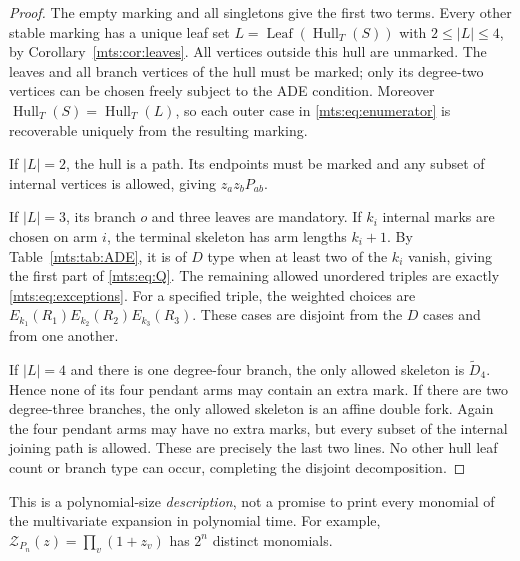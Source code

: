 \documentclass[11pt]{article}
\numberwithin{equation}{section}
\theoremstyle{definition}
\newcommand{\Hull}{\operatorname{Hull}}
\newcommand{\Leaf}{\operatorname{Leaf}}
\newcommand{\Zpoly}{\mathcal Z}
\begin{document}
\begin{proof}
The empty marking and all singletons give the first two terms. Every
other stable marking has a unique leaf set
$L=\Leaf(\Hull_T(S))$ with $2\le|L|\le4$, by Corollary~\ref{mts:cor:leaves}.
All vertices outside this hull are unmarked. The leaves and all branch
vertices of the hull must be marked; only its degree-two vertices can be
chosen freely subject to the ADE condition. Moreover
$\Hull_T(S)=\Hull_T(L)$, so each outer case in \eqref{mts:eq:enumerator} is
recoverable uniquely from the resulting marking.

If $|L|=2$, the hull is a path. Its endpoints must be marked and any
subset of internal vertices is allowed, giving $z_a z_b P_{ab}$.

If $|L|=3$, its branch $o$ and three leaves are mandatory. If $k_i$
internal marks are chosen on arm $i$, the terminal skeleton has arm
lengths $k_i+1$. By Table~\ref{mts:tab:ADE}, it is of $D$ type when at least two of
the $k_i$ vanish, giving the first part of \eqref{mts:eq:Q}. The remaining
allowed unordered triples are exactly \eqref{mts:eq:exceptions}. For a
specified triple, the weighted choices are
$E_{k_1}(R_1)E_{k_2}(R_2)E_{k_3}(R_3)$. These cases are disjoint from the
$D$ cases and from one another.

If $|L|=4$ and there is one degree-four branch, the only allowed skeleton
is $\widetilde D_4$. Hence none of its four pendant arms may contain an
extra mark. If there are two degree-three branches, the only allowed
skeleton is an affine double fork. Again the four pendant arms may have
no extra marks, but every subset of the internal joining path is allowed.
These are precisely the last two lines. No other hull leaf count or branch
type can occur, completing the disjoint decomposition.
\end{proof}

This is a polynomial-size \emph{description}, not a promise to print every
monomial of the multivariate expansion in polynomial time. For example,
$\Zpoly_{P_n}(z)=\prod_v(1+z_v)$ has $2^n$ distinct monomials.
\end{document}
